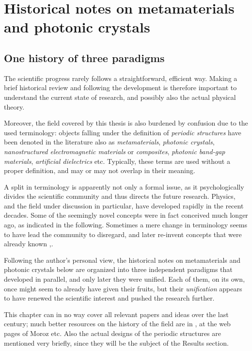 \section{Historical notes on metamaterials and photonic crystals}%
\subsection{One history of three paradigms} %
The scientific progress rarely follows a straightforward, efficient way. Making a brief historical review and following the development is therefore important to understand the current state of research, and possibly also the actual physical theory. 

Moreover, the field covered by this thesis is also burdened by confusion due to the used terminology: objects falling under the definition of \textit{periodic structures} have been denoted in the literature also as \textit{metamaterials}, \textit{photonic crystals}, \textit{nanostructured electromagnetic materials} or \textit{composites}, \textit{photonic band-gap materials}, \textit{artificial dielectrics} etc. Typically, these terms are used without a proper definition, and may or may not \cite{smith2006homogenization} overlap in their meaning. 

A split in terminology is apparently not only a formal issue, as it psychologically divides the scientific community and thus directs the future research.
Physics, and the field under discussion in particular, have developed rapidly in the recent decades. Some of the seemingly novel concepts were in fact conceived much longer ago, as indicated in the following. Sometimes a mere change in terminology seems to have lead the community to disregard, and later re-invent concepts that were already known \cite{sihvola2002electromagnetic},\cite[p. 5]{klingshirn2007semiconductor}. 


Following the author's personal view,
the historical notes on metamaterials and photonic crystals below are organized into three independent paradigms that developed in parallel, and only later they were unified. Each of them, on its own, once might seem to already have given their fruits, but their \textit{unification} appears to have renewed the scientific interest and pushed the research further. 

This chapter can in no way cover all relevant papers and ideas over the last century; much better resources on the history of the field are in \cite{shamonina2007metamaterials,eleftheriades2012transforming, paudyal2013left}, at the web pages of Moroz \cite{moroz} etc. Also the actual designs of the periodic structures are mentioned very briefly, since they will be the subject of the Results section.

